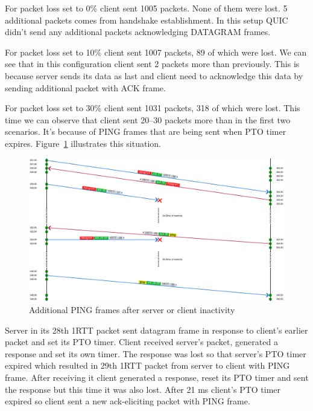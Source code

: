 For packet loss set to 0\% client sent 1005 packets.
None of them were lost.
5 additional packets comes from handshake establishment.
In this setup QUIC didn't send any additional packets acknowledging DATAGRAM frames.

For packet loss set to 10\% client sent 1007 packets, 89 of which were lost.
We can see that in this configuration client sent 2 packets more than previously.
This is because server sends its data as last and client need to acknowledge this data by sending additional packet with ACK frame.

For packet loss set to 30\% client sent 1031 packets, 318 of which were lost.
This time we can observe that client sent 20--30 packets more than in the first two scenarios.
It's because of PING frames that are being sent when PTO timer expires.
Figure~\ref{fig:dgram_ping_frames} illustrates this situation.

\begin{figure}
    \centering
    \includegraphics[width=\textwidth]{img/__09__datagrams/dgram_retransmission_ping.png}
    \caption{Additional PING frames after server or client inactivity}
    \label{fig:dgram_ping_frames}
\end{figure}

Server in its 28th 1RTT packet sent datagram frame in response to client's earlier packet and set its PTO timer.
Client received server's packet, generated a response and set its own timer.
The response was lost so that server's PTO timer expired which resulted in 29th 1RTT packet from server to client with PING frame.
After receiving it client generated a response, reset its PTO timer and sent the response but this time it was also lost.
After 21 ms client's PTO timer expired so client sent a new ack-eliciting packet with PING frame.
